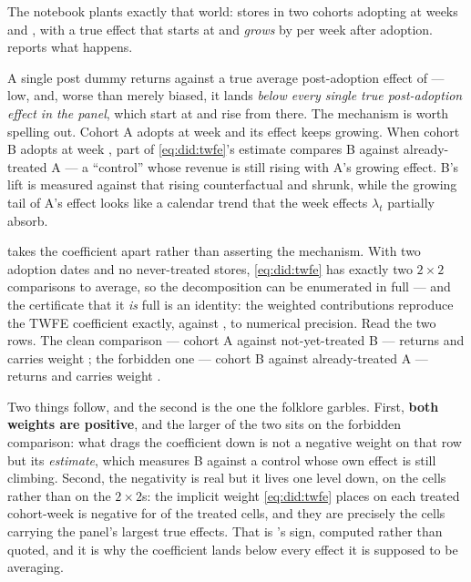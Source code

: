The notebook plants exactly that world: \nbEightStagNStores{} stores in two cohorts adopting at
weeks \nbEightStagCohortA{} and \nbEightStagCohortB, with a true effect that starts at
\eur{\nbEightStagBase} and \emph{grows} by \eur{\nbEightStagGrowth} per week after adoption.
 reports what happens.




A single post dummy returns \eur{\nbEightTwfeNaive} against a true average post-adoption effect of
\eur{\nbEightTwfeTrue} --- \eur{\nbEightTwfeBiasAbs} low, and, worse than merely biased, it lands
\emph{below every single true post-adoption effect in the panel}, which start at
\eur{\nbEightStagBase} and rise from there. The mechanism is worth spelling out. Cohort A adopts at
week \nbEightStagCohortA{} and its effect keeps growing. When cohort B adopts at week
\nbEightStagCohortB, part of \cref{eq:did:twfe}'s estimate compares B against already-treated A ---
a ``control'' whose revenue is still rising with A's growing effect. B's lift is measured against
that rising counterfactual and shrunk, while the growing tail of A's effect looks like a calendar
trend that the week effects $\lambda_t$ partially absorb.

 takes the coefficient apart rather than asserting the mechanism. With two
adoption dates and no never-treated stores, \cref{eq:did:twfe} has exactly two $2 \times 2$
comparisons to average, so the decomposition can be enumerated in full --- and the certificate that
it \emph{is} full is an identity: the weighted contributions reproduce the TWFE coefficient exactly,
\eur{\nbEightBaconSum} against \eur{\nbEightTwfeNaive}, to numerical precision. Read the two rows.
The clean comparison --- cohort A against not-yet-treated B --- returns \eur{\nbEightBaconDidClean}
and carries weight \nbEightBaconWClean; the forbidden one --- cohort B against already-treated A ---
returns \eur{\nbEightBaconDidForbidden} and carries weight \nbEightBaconWForbidden.

Two things follow, and the second is the one the folklore garbles. First, \textbf{both weights are
positive}, and the larger of the two sits on the forbidden comparison: what drags the coefficient
down is not a negative weight on that row but its \emph{estimate}, which measures B against a
control whose own effect is still climbing. Second, the negativity is real but it lives one level
down, on the cells rather than on the $2 \times 2$s: the implicit weight \cref{eq:did:twfe} places on
each treated cohort-week is negative for \nbEightBaconNegCells{} of the \nbEightBaconTreatedCells{}
treated cells, and they are precisely the cells carrying the panel's largest true effects. That is
\citeauthor{dechaisemartin2020}'s sign, computed rather than quoted, and it is why the coefficient
lands below every effect it is supposed to be averaging.


